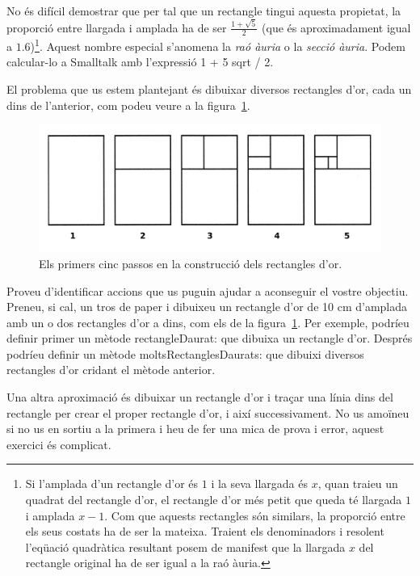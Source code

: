 No és difícil demostrar que per tal que un rectangle tingui aquesta propietat, la proporció entre llargada i amplada ha de ser $\frac{1 + \sqrt{5}}{2}$ (que és aproximadament igual a $1.6$)\footnote{Si l'amplada d'un rectangle d'or és $1$ i la seva llargada és $x$, quan traieu un quadrat del rectangle d'or, el rectangle d'or més petit que queda té llargada $1$ i amplada $x-1$. Com que aquests rectangles són similars, la proporció entre els seus costats ha de ser la mateixa. Traient els denominadors i resolent l'eqüació quadràtica resultant posem de manifest que la llargada $x$ del rectangle original ha de ser igual a la raó àuria.}. Aquest nombre especial s'anomena la \emph{raó àuria} o la \emph{secció àuria}. Podem calcular-lo a Smalltalk amb l'expressió \textsf{1 + 5 sqrt / 2}.

El problema que us estem plantejant és dibuixar diversos rectangles d'or, cada un dins de l'anterior, com podeu veure a la figura~\ref{fig1603}.
\begin{figure}[h!]
\begin{center}
\includegraphics[scale=0.125]{Imatges/figura16-3.pdf}
\end{center}
\caption{Els primers cinc passos en la construcció dels rectangles d'or.}
\label{fig1603}
\end{figure}

Proveu d'identificar accions que us puguin ajudar a aconseguir el vostre objectiu. Preneu, si cal, un tros de paper i dibuixeu un rectangle d'or de 10 cm d'amplada amb un o dos rectangles d'or a dins, com els de la figura~\ref{fig1603}. Per exemple, podríeu definir primer un mètode \textsf{rectangleDaurat:} que dibuixa un rectangle d'or. Després podríeu definir un mètode \textsf{moltsRectanglesDaurats:} que dibuixi diversos rectangles d'or cridant el mètode anterior.

Una altra aproximació és dibuixar un rectangle d'or i traçar una línia dins del rectangle per crear el proper rectangle d'or, i així successivament. No us amoïneu si no us en sortiu a la primera i heu de fer una mica de prova i error, aquest exercici és complicat.

